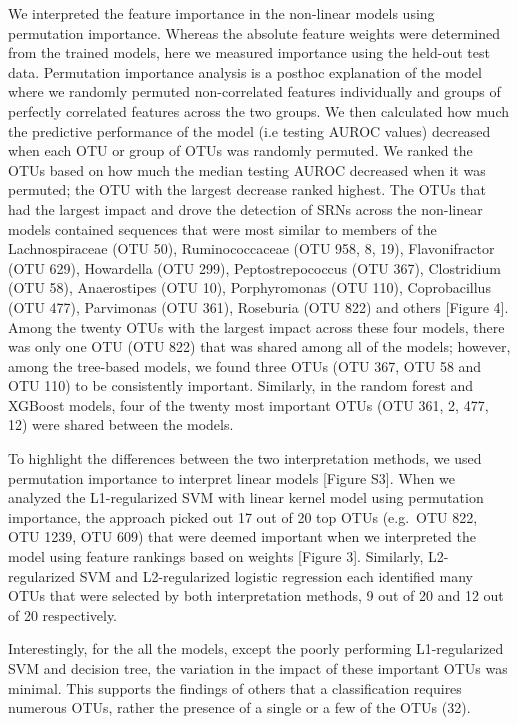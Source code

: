 \documentclass[11pt,]{article}
\begin{document}
We interpreted the feature importance in the non-linear models using
permutation importance. Whereas the absolute feature weights were
determined from the trained models, here we measured importance using
the held-out test data. Permutation importance analysis is a posthoc
explanation of the model where we randomly permuted non-correlated
features individually and groups of perfectly correlated features across
the two groups. We then calculated how much the predictive performance
of the model (i.e testing AUROC values) decreased when each OTU or group
of OTUs was randomly permuted. We ranked the OTUs based on how much the
median testing AUROC decreased when it was permuted; the OTU with the
largest decrease ranked highest. The OTUs that had the largest impact
and drove the detection of SRNs across the non-linear models contained
sequences that were most similar to members of the Lachnospiraceae (OTU
50), Ruminococcaceae (OTU 958, 8, 19), Flavonifractor (OTU 629),
Howardella (OTU 299), Peptostrepococcus (OTU 367), Clostridium (OTU 58),
Anaerostipes (OTU 10), Porphyromonas (OTU 110), Coprobacillus (OTU 477),
Parvimonas (OTU 361), Roseburia (OTU 822) and others {[}Figure 4{]}.
Among the twenty OTUs with the largest impact across these four models,
there was only one OTU (OTU 822) that was shared among all of the
models; however, among the tree-based models, we found three OTUs (OTU
367, OTU 58 and OTU 110) to be consistently important. Similarly, in the
random forest and XGBoost models, four of the twenty most important OTUs
(OTU 361, 2, 477, 12) were shared between the models.

To highlight the differences between the two interpretation methods, we
used permutation importance to interpret linear models {[}Figure S3{]}.
When we analyzed the L1-regularized SVM with linear kernel model using
permutation importance, the approach picked out 17 out of 20 top OTUs
(e.g.~OTU 822, OTU 1239, OTU 609) that were deemed important when we
interpreted the model using feature rankings based on weights {[}Figure
3{]}. Similarly, L2-regularized SVM and L2-regularized logistic
regression each identified many OTUs that were selected by both
interpretation methods, 9 out of 20 and 12 out of 20 respectively.

Interestingly, for the all the models, except the poorly performing
L1-regularized SVM and decision tree, the variation in the impact of
these important OTUs was minimal. This supports the findings of others
that a classification requires numerous OTUs, rather the presence of a
single or a few of the OTUs (32).
\end{document}
